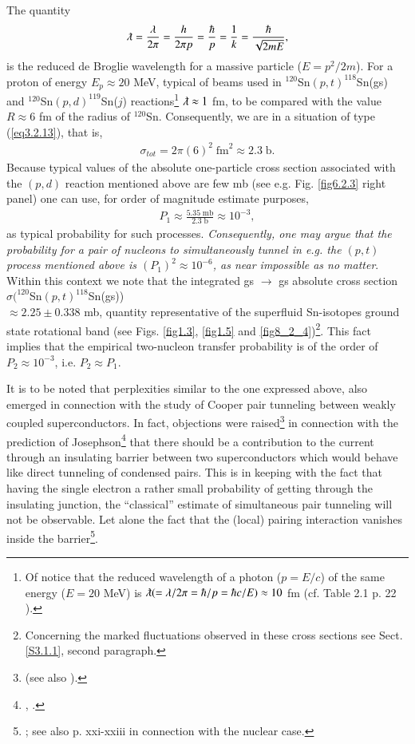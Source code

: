 The quantity
\begin{align}\label{eq3.2.16}
\lambdabar=\frac{\lambda}{2\pi}=\frac{h}{2\pi p}=\frac{\hbar}{p}=\frac{1}{k}=\frac{\hbar}{\sqrt{2mE}},
\end{align}
is the reduced de Broglie wavelength for a massive particle ($E=p^2/2m$). For a proton of energy $E_p\approx 20$ MeV, typical of beams used in $^{120}$Sn$(p,t)^{118}$Sn(gs) and $^{120}$Sn$(p,d)^{119}$Sn($j$) reactions\footnote{Of notice that the reduced wavelength of a photon ($p=E/c$) of the same energy ($E= 20$ MeV) is $\lambdabar (=\lambda/2\pi=\hbar/p=\hbar c/E)\approx 10$ fm (cf. Table 2.1 p. 22 \cite{Satchler:80}).} $\lambdabar\approx 1$ fm, to be compared with the value $R\approx 6$ fm of the radius of $^{120}$Sn. Consequently, we are in a situation of type (\ref{eq3.2.13}), that is,
\begin{align}
\sigma_{tot}=2\pi(6)^2\;\text{fm}^2\approx 2.3\;\text{b}.
\end{align}
Because typical values of the absolute one-particle cross section associated  with the $(p,d)$ reaction mentioned above are few mb (see e.g. Fig. \ref{fig6.2.3} right panel) one can use, for order of magnitude estimate purposes,  
\begin{align}
P_1\approx\frac{5.35\; \text{mb}}{2.3\;\text{b}}\approx 10^{-3},
\end{align}
as  typical probability for such processes. \textit{Consequently, one may argue that the probability for a  pair of nucleons to simultaneously tunnel in e.g. the $(p,t)$ process mentioned above is $(P_1)^2\approx10^{-6}$, as near impossible as no matter}. Within this context we note that the integrated gs $\rightarrow$ gs absolute cross section $\sigma(^{120}$Sn$(p,t)^{118}$Sn(gs))\\$\approx 2.25 \pm$0.338 mb, quantity representative of the superfluid Sn-isotopes ground state rotational band (see Figs. \ref{fig1.3}, \ref{fig1.5} and \ref{fig8_2_4})\footnote{Concerning the marked fluctuations observed in these cross sections see Sect. \ref{S3.1.1}, second paragraph.}. This fact implies that the empirical two-nucleon transfer probability is of the order of $P_2\approx 10^{-3}$, i.e. $P_2\approx P_1$. 

It is to be noted that  perplexities similar to the one expressed above,  also emerged in connection with the study  of Cooper pair tunneling between weakly coupled superconductors. In fact, objections were raised\footnote{\cite{Bardeen:62,Bardeen:61} (see also \cite{Pippard:12,Cohen:62,McDonald:01}).}   in connection with the prediction of Josephson\footnote{\cite{Josephson:62}, \cite{Anderson:64b}.} that there should be a contribution to the current through an insulating barrier between two superconductors which would behave like direct tunneling of condensed pairs. This is in keeping with the fact that having the single electron a rather small probability of getting through the insulating junction,  the ``classical'' estimate of simultaneous pair tunneling will not be observable. Let alone the fact that the (local) pairing interaction vanishes inside the barrier\footnote{\cite{Anderson:70};  see also \cite{Broglia:19d} p. xxi-xxiii in connection with the nuclear case.}.


